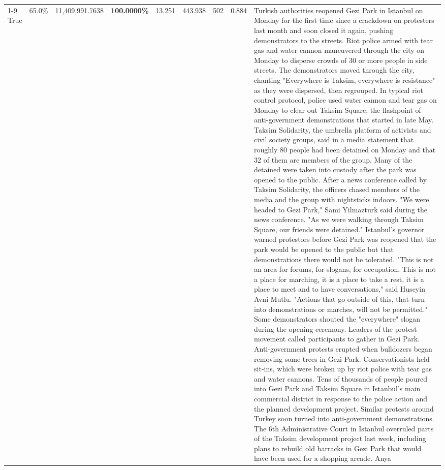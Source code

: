 \begin{table}[H]
\begin{tabular}{lllrlllll}
\cline{1-9}
True & 65.0\% & 11,409,991.7638 & \bfseries \color{red} 100.0000\% & 13.251 & 443.938 & 502 & 0.884 & Turkish authorities reopened Gezi Park in Istanbul on Monday for the first time since a crackdown on protesters last month and soon closed it again, pushing demonstrators to the streets. Riot police armed with tear gas and water cannon maneuvered through the city on Monday to disperse crowds of 30 or more people in side streets. The demonstrators moved through the city, chanting "Everywhere is Taksim, everywhere is resistance" as they were dispersed, then regrouped. In typical riot control protocol, police used water cannon and tear gas on Monday to clear out Taksim Square, the flashpoint of anti-government demonstrations that started in late May. Taksim Solidarity, the umbrella platform of activists and civil society groups, said in a media statement that roughly 80 people had been detained on Monday and that 32 of them are members of the group. Many of the detained were taken into custody after the park was opened to the public. After a news conference called by Taksim Solidarity, the officers chased members of the media and the group with nightsticks indoors. "We were headed to Gezi Park," Sami Yilmazturk said during the news conference. "As we were walking through Taksim Square, our friends were detained." Istanbul's governor warned protestors before Gezi Park was reopened that the park would be opened to the public but that demonstrations there would not be tolerated. "This is not an area for forums, for slogans, for occupation. This is not a place for marching, it is a place to take a rest, it is a place to meet and to have conversations," said Huseyin Avni Mutlu. "Actions that go outside of this, that turn into demonstrations or marches, will not be permitted." Some demonstrators shouted the "everywhere" slogan during the opening ceremony. Leaders of the protest movement called participants to gather in Gezi Park. Anti-government protests erupted when bulldozers began removing some trees in Gezi Park. Conservationists held sit-ins, which were broken up by riot police with tear gas and water cannons. Tens of thousands of people poured into Gezi Park and Taksim Square in Istanbul's main commercial district in response to the police action and the planned development project. Similar protests around Turkey soon turned into anti-government demonstrations. The 6th Administrative Court in Istanbul overruled parts of the Taksim development project last week, including plans to rebuild old barracks in Gezi Park that would have been used for a shopping arcade. Anya \\

\end{tabular}
\end{table}
